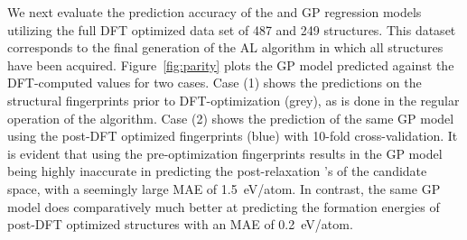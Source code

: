 We next evaluate the prediction accuracy of the \IrOtwo and \IrOthree GP regression models utilizing the full DFT optimized data set of 487 \IrOtwo and 249 \IrOthree structures.
%
This dataset corresponds to the final generation of the AL algorithm in which all structures have been acquired.
%
Figure~\ref{fig:parity} plots the GP model predicted \DHf against the DFT-computed values for two cases.
%
Case (1) shows the predictions on the structural fingerprints prior to DFT-optimization (grey), as is done in the regular operation of the algorithm.
%
Case (2) shows the prediction of the same GP model using the post-DFT optimized fingerprints (blue) with \num{10}-fold cross-validation.
%
It is evident that using the pre-optimization fingerprints results in the GP model being highly inaccurate in predicting the post-relaxation \DHf's of the candidate space,
with a seemingly large MAE of \mytilde\SI{1.5}{\electronvolt}/atom.
%
In contrast, the same GP model does comparatively much better at predicting the formation energies of post-DFT optimized structures with an MAE of \mytilde\SI{0.2}{\electronvolt}/atom.



